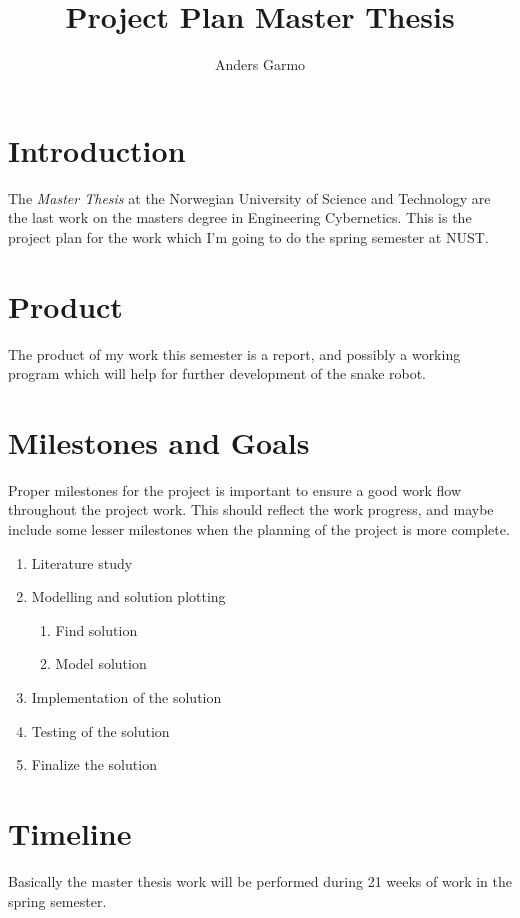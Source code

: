 \documentclass[a4paper, 10pt]{article}
\title{Project Plan Master Thesis}
\author{Anders Garmo}
\begin{document}
\maketitle


\section{Introduction}
The \emph{Master Thesis} at the Norwegian University of Science and Technology are the
last work on the masters degree in Engineering Cybernetics. This is the project plan for
the work which I'm going to do the spring semester at NUST. 

\section{Product}
The product of my work this semester is a report, and possibly a working program which
will help for further development of the snake robot. 


\section{Milestones and Goals}
Proper milestones for the project is important to ensure a good work flow throughout the
project work. This should reflect the work progress, and maybe include some lesser
milestones when the planning of the project is more complete.

\begin{enumerate}
    \item Literature study
    \item Modelling and solution plotting
        \begin{enumerate}
            \item Find solution
            \item Model solution
        \end{enumerate}
    \item Implementation of the solution
    \item Testing of the solution
    \item Finalize the solution
\end{enumerate}



\section{Timeline}
Basically the master thesis work will be performed during 21 weeks of work in the spring
semester. 
\end{document}
